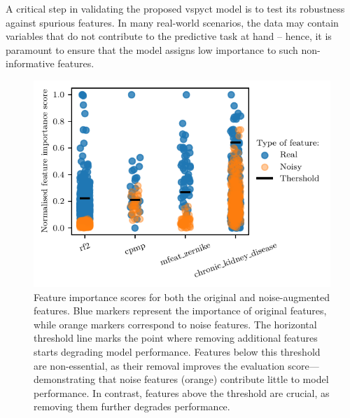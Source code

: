\documentclass[3p,review,authoryear]{elsarticle}
\begin{document}

A critical step in validating the proposed \gls{vspyct} model is to test its robustness against spurious features. 
In many real-world scenarios, the data may contain variables that do not contribute to the predictive task at hand -- hence, it is paramount to ensure that the model assigns low importance to such non-informative features. 

\begin{figure}[h!]
    \centering
    \includegraphics{feat_importances.pdf}
    \caption{Feature importance scores for both the original and noise-augmented features.
    Blue markers represent the importance of original features, while orange markers correspond to noise features. The horizontal threshold line marks the point where removing additional features starts degrading model performance. Features below this threshold are non-essential, as their removal improves the evaluation score—demonstrating that noise features (orange) contribute little to model performance. In contrast, features above the threshold are crucial, as removing them further degrades performance.}
    \label{fig:feature_importances}
\end{figure}
\end{document}
